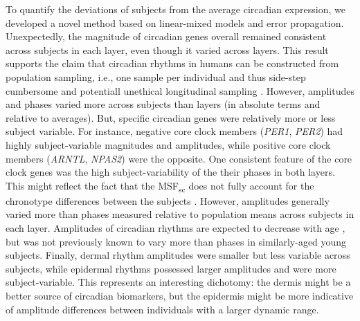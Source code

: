 To quantify the deviations of subjects from the average circadian expression, we developed a novel method based on linear-mixed models and error propagation. Unexpectedly, the magnitude of circadian genes overall remained consistent across subjects in each layer, even though it varied across layers. This result supports the claim that circadian rhythms in humans can be constructed from population sampling, i.e., one sample per individual and thus side-step cumbersome and potentiall unethical longitudinal sampling \cite{Anafi2017,Wu2018,Ruben2018}. However, amplitudes and phases varied more across subjects than layers (in absolute terms and relative to averages). But, specific circadian genes were relatively more or less subject variable. For instance, negative core clock members (\textit{PER1}, \textit{PER2}) had highly subject-variable magnitudes and amplitudes, while positive core clock members (\textit{ARNTL}, \textit{NPAS2}) were the opposite. One consistent feature of the core clock genes was the high subject-variability of the their phases in both layers. This might reflect the fact that the MSF\textsubscript{sc} does not fully account for the chronotype differences between the subjects . However, amplitudes generally varied more than phases measured relative to population means across subjects in each layer. Amplitudes of circadian rhythms are expected to decrease with age \cite{Blacher2022}, but was not previously known to vary more than phases in similarly-aged young subjects. Finally, dermal rhythm amplitudes were smaller but less variable across subjects, while epidermal rhythms possessed larger amplitudes and were more subject-variable. This represents an interesting dichotomy: the dermis might be a better source of circadian biomarkers, but the epidermis might be more indicative of amplitude differences between individuals with a larger dynamic range.


